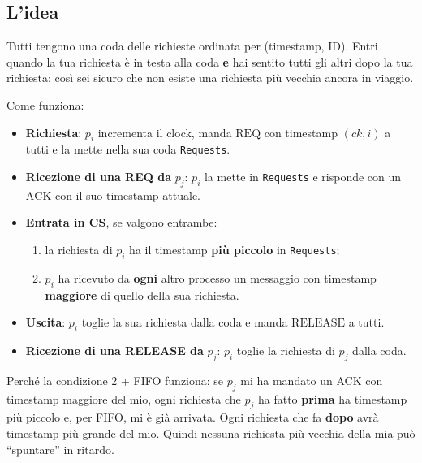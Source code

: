 \subsection{L'idea}

\begin{inbreve}

Tutti tengono una coda delle richieste ordinata per (timestamp, ID). Entri quando la tua richiesta è in testa alla coda \textbf{e} hai sentito tutti gli altri dopo la tua richiesta: così sei sicuro che non esiste una richiesta più vecchia ancora in viaggio.

\end{inbreve}

Come funziona:

\begin{itemize}
\tightlist
\item
  \textbf{Richiesta}: \(p_i\) incrementa il clock, manda \(\text{REQ}\) con timestamp \((ck, i)\) a tutti e la mette nella sua coda \texttt{Requests}.
\item
  \textbf{Ricezione di una REQ da} \(p_j\): \(p_i\) la mette in \texttt{Requests} e risponde con un \(\text{ACK}\) con il suo timestamp attuale.
\item
  \textbf{Entrata in CS}, se valgono entrambe:

  \begin{enumerate}
  \def\labelenumi{\arabic{enumi}.}
  \tightlist
  \item
    la richiesta di \(p_i\) ha il timestamp \textbf{più piccolo} in \texttt{Requests};
  \item
    \(p_i\) ha ricevuto da \textbf{ogni} altro processo un messaggio con timestamp \textbf{maggiore} di quello della sua richiesta.
  \end{enumerate}
\item
  \textbf{Uscita}: \(p_i\) toglie la sua richiesta dalla coda e manda \(\text{RELEASE}\) a tutti.
\item
  \textbf{Ricezione di una RELEASE da} \(p_j\): \(p_i\) toglie la richiesta di \(p_j\) dalla coda.
\end{itemize}

Perché la condizione 2 + FIFO funziona: se \(p_j\) mi ha mandato un ACK con timestamp maggiore del mio, ogni richiesta che \(p_j\) ha fatto \textbf{prima} ha timestamp più piccolo e, per FIFO, mi è già arrivata. Ogni richiesta che fa \textbf{dopo} avrà timestamp più grande del mio. Quindi nessuna richiesta più vecchia della mia può ``spuntare'' in ritardo.

